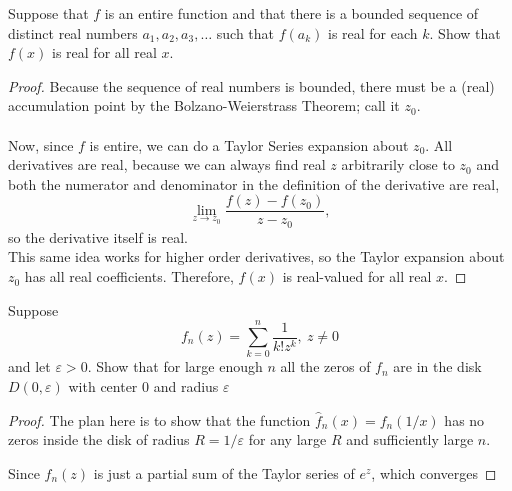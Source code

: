 \documentclass{article}
\newenvironment{problem}[2][Problem]{\begin{trivlist}
\item[\hskip \labelsep {\bfseries #1}\hskip \labelsep {\bfseries #2.}]}{\end{trivlist}}
\begin{document}
\begin{problem}{3}
  Suppose that $f$ is an entire function and that there is a bounded sequence of
  distinct real numbers $a_1, a_2, a_3, \hdots$ such that $f(a_k)$ is real for
  each $k$. Show that $f(x)$ is real for all real $x$.
\end{problem}

\begin{proof}
  Because the sequence of real numbers is bounded, there must be a (real)
  accumulation point by the Bolzano-Weierstrass Theorem; call it $z_0$.
  \\~\\
  Now, since $f$ is entire, we can do a Taylor Series expansion about $z_0$.
  All derivatives are real, because we can always find real $z$ arbitrarily
  close to $z_0$ and both the numerator and denominator in the definition of the
  derivative are real, \[
    \lim_{z \rightarrow z_0} \frac{f(z) - f(z_0)}{z - z_0},
  \] so the derivative itself is real.
  \\
  This same idea works for higher order derivatives, so the Taylor expansion
  about $z_0$ has all real coefficients. Therefore, $f(x)$ is real-valued for
  all real $x$.
\end{proof}

\pagebreak

\begin{problem}{4}
  Suppose \[
    f_n(z) = \sum_{k=0}^n\frac{1}{k!z^k},\ z \neq 0
  \] and let $\varepsilon > 0$. Show that for large enough $n$ all the zeros of
  $f_n$ are in the disk $D(0, \varepsilon)$ with center 0 and radius $\varepsilon$
\end{problem}

\begin{proof}
  The plan here is to show that the function $\hat f_n(x) = f_n(1/x)$ has no
  zeros inside the disk of radius $R = 1/\varepsilon$ for any large $R$ and
  sufficiently large $n$.

  Since $\hat f_n(z)$ is just a partial sum of the Taylor series of $e^z$, which
  converges
\end{proof}
\end{document}
